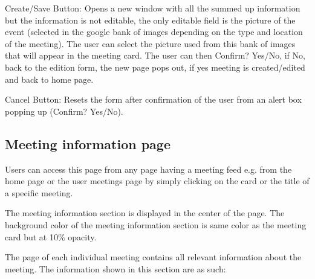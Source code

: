 \documentclass[conference]{IEEEtran}
\begin{document}
Create/Save Button: Opens a new window with all the summed up information but the information is not editable, the only editable field is the picture of the event (selected in the google bank of images depending on the type and location of the meeting). 
The user can select the picture used from this bank of images that will appear in the meeting card. 
The user can then Confirm? Yes/No, if No, back to the edition form, the new page pops out, if yes meeting is created/edited and back to home page.

Cancel Button: Resets the form after confirmation of the user from an alert box popping up (Confirm? Yes/No).

\subsection{Meeting information page}

Users can access this page from any page having a meeting feed e.g. from the home page or the user meetings page by simply clicking on the card or the title of a specific meeting. 

The meeting information section is displayed in the center of the page. 
The background color of the meeting information section is same color as the meeting card but at 10\% opacity.

The page of each individual meeting contains all relevant information about the meeting.
The information shown in this section are as such:
\end{document}
